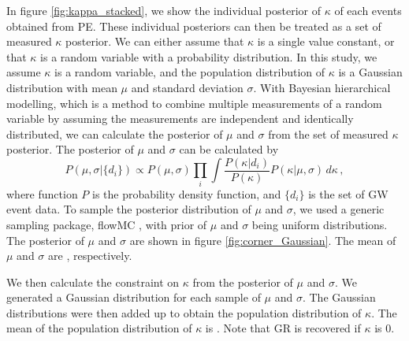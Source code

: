 \documentclass[aps,prd,twocolumn,superscriptaddress,preprintnumbers,floatfix,nofootinbib]{revtex4-2}
\begin{document}
In figure \ref{fig:kappa_stacked}, we show the individual posterior of $\kappa$ of each events obtained from PE.
These individual posteriors can then be treated as a set of measured $\kappa$ posterior.
We can either assume that $\kappa$ is a single value constant, or that $\kappa$ is a random variable with a probability distribution.
In this study, we assume $\kappa$ is a random variable, and the population distribution of $\kappa$ is a Gaussian distribution with mean $\mu$ and standard deviation $\sigma$.
With Bayesian hierarchical modelling, which is a method to combine multiple measurements of a random variable by assuming the measurements are independent and identically distributed, we can calculate the posterior of $\mu$ and $\sigma$ from the set of measured $\kappa$ posterior.
The posterior of $\mu$ and $\sigma$ can be calculated by
\begin{equation}
    P(\mu,\sigma|\{d_i\})\propto P(\mu,\sigma)\prod_{i}\int\frac{P(\kappa|d_i)}{P(\kappa)}P(\kappa|\mu,\sigma)\,d\kappa\,,
\end{equation}
where function $P$ is the probability density function, and $\{d_i\}$ is the set of GW event data.
To sample the posterior distribution of $\mu$ and $\sigma$, we used a generic sampling package, flowMC \citep{flowMC}, with prior of $\mu$ and $\sigma$ being uniform distributions.
The posterior of $\mu$ and $\sigma$ are shown in figure \ref{fig:corner_Gaussian}.
The mean of $\mu$ and $\sigma$ are , respectively.


We then calculate the constraint on $\kappa$ from the posterior of $\mu$ and $\sigma$.
We generated a Gaussian distribution for each sample of $\mu$ and $\sigma$.
The Gaussian distributions were then added up to obtain the population distribution of $\kappa$.
The mean of the population distribution of $\kappa$ is .
Note that GR is recovered if $\kappa$ is $0$.
\end{document}
